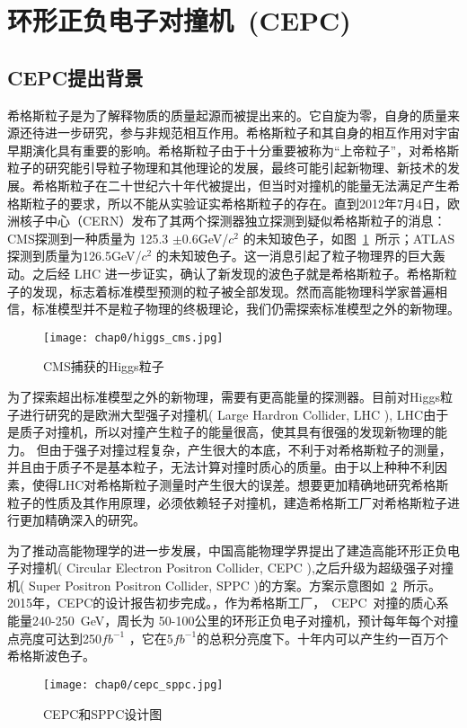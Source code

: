 \section{环形正负电子对撞机~(CEPC)~}
\subsection{CEPC提出背景}
希格斯粒子\cite{higgs1}\cite{higgs2}是为了解释物质的质量起源而被提出来的。它自旋为零，自身的质量来源还待进一步研究，参与非规范相互作用。希格斯粒子和其自身的相互作用对宇宙早期演化具有重要的影响。希格斯粒子由于十分重要被称为“上帝粒子”，对希格斯粒子的研究能引导粒子物理和其他理论的发展，最终可能引起新物理、新技术的发展。希格斯粒子在二十世纪六十年代被提出，但当时对撞机的能量无法满足产生希格斯粒子的要求，所以不能从实验证实希格斯粒子的存在。直到2012年7月4日，欧洲核子中心（CERN）发布了其两个探测器独立探测到疑似希格斯粒子的消息\cite{cern1}\cite{cern2}\cite{cern3}：CMS探测到一种质量为 125.3 $\pm$0.6GeV/$c^{2}$ 的未知玻色子，如图~\ref{fig:cms_higgs}~所示\cite{cern4}；ATLAS 探测到质量为126.5GeV/$c^{2}$ 的未知玻色子\cite{cern5}。这一消息引起了粒子物理界的巨大轰动。之后经 LHC 进一步证实，确认了新发现的波色子就是希格斯粒子。希格斯粒子的发现，标志着标准模型预测的粒子被全部发现。然而高能物理科学家普遍相信，标准模型并不是粒子物理的终极理论，我们仍需探索标准模型之外的新物理。
\begin{figure}[!h]
  \centering
  \texttt{[image: chap0/higgs\_cms.jpg]}
  \caption{CMS捕获的Higgs粒子}
  \label{fig:cms_higgs}
\end{figure}

为了探索超出标准模型之外的新物理，需要有更高能量的探测器。目前对Higgs粒子进行研究的是欧洲大型强子对撞机( Large Hardron Collider, LHC ), LHC由于是质子对撞机，所以对撞产生粒子的能量很高，使其具有很强的发现新物理的能力。 但由于强子对撞过程复杂，产生很大的本底，不利于对希格斯粒子的测量，并且由于质子不是基本粒子，无法计算对撞时质心的质量。由于以上种种不利因素，使得LHC对希格斯粒子测量时产生很大的误差。想要更加精确地研究希格斯粒子的性质及其作用原理，必须依赖轻子对撞机，建造希格斯工厂对希格斯粒子进行更加精确深入的研究。 

为了推动高能物理学的进一步发展，中国高能物理学界提出了建造高能环形正负电子对撞机( Circular Electron Positron Collider, CEPC ),之后升级为超级强子对撞机( Super Positron Positron Collider, SPPC )的方案。方案示意图如~\ref{fig:cepc_sppc}~所示。2015年，CEPC的设计报告初步完成。，作为希格斯工厂，~CEPC~对撞的质心系能量240-250~GeV，周长为 50-100公里的环形正负电子对撞机，预计每年每个对撞点亮度可达到250$fb^{-1}$ ，它在5$fb^{-1}$的总积分亮度下。十年内可以产生约一百万个希格斯波色子\cite{zhuxuezheng}。
\begin{figure}[!h]
  \centering
  \texttt{[image: chap0/cepc\_sppc.jpg]}
  \caption{CEPC和SPPC设计图}
  \label{fig:cepc_sppc}
\end{figure}

